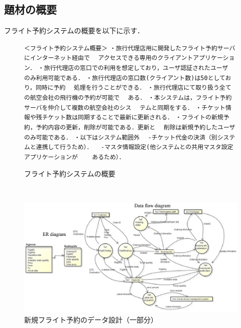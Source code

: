 \subsection{題材の概要}
フライト予約システムの概要を以下に示す．
\begin{figure}[h]%
\vbox{%
{\small
\hbox{\verb/＜フライト予約システム概要＞/}
\hbox{\verb/・旅行代理店用に開発したフライト予約サーバにインターネット経由で/}
\hbox{\verb/　アクセスできる専用のクライアントアプリケーション．/}
\hbox{\verb/・旅行代理店の窓口での利用を想定しており，ユーザ認証されたユーザ/}
\hbox{\verb/　のみ利用可能である．/}
\hbox{\verb/・旅行代理店の窓口数(クライアント数)は50としており，同時に予約/}
\hbox{\verb/　処理を行うことができる．/}
\hbox{\verb/・旅行代理店にて取り扱う全ての航空会社の飛行機の予約が可能で/}
\hbox{\verb/　ある．/}
\hbox{\verb/・本システムは，フライト予約サーバを仲介して複数の航空会社のシス/}
\hbox{\verb/　テムと同期をする．/}
\hbox{\verb/・チケット情報や残チケット数は同期することで最新に更新される．/}
\hbox{\verb/・フライトの新規予約，予約内容の更新，削除が可能である．更新と/}
\hbox{\verb/　削除は新規予約したユーザのみ可能である．/}
\hbox{\verb/・以下はシステム範囲外/}
\hbox{\verb/　-チケット代金の決済（別システムと連携して行うため）．/}
\hbox{\verb/　-マスタ情報設定(他システムとの共用マスタ設定アプリケーションが/}
\hbox{\verb/　　あるため）．/}
}
}
\begin{center}
\end{center}
\caption{フライト予約システムの概要}
\label{OVSPEC}
\end{figure}

\begin{figure}[tb]　%
\begin{center}
\includegraphics[scale=0.68]{./image/dfdanderd.eps}
\end{center}
\caption{新規フライト予約のデータ設計（一部分）}
\label{fig:DFD}
\end{figure}

